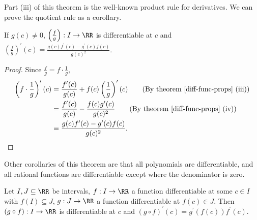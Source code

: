 \documentclass[../real_analysis.tex]{subfiles}
\begin{document}
        Part (iii) of this theorem is the well-known product rule for derivatives. We can prove the quotient rule as a corollary.
        \begin{corollary}
            If $g(c)\neq0$, $\left(\frac{f}{g}\right):I\to\RR$ is differentiable at $c$ and ${\left(\frac{f}{g}\right)^\prime(c)=\frac{g(c)f^\prime(c)-g^\prime(c) f(c)}{g(c)^2}}$.
        \end{corollary}
        \begin{proof}
            Since $\frac{f}{g}=f\cdot\frac{1}{g}$,
            \begin{align}
                \left(f\cdot\frac{1}{g}\right)^\prime(c)&=\frac{f^\prime(c)}{g(c)}+f(c)\left(\frac{1}{g}\right)^\prime(c)\tag{By theorem \ref{diff-func-props} (iii)}\\
                &=\frac{f^\prime(c)}{g(c)}-\frac{f(c)g^\prime(c)}{g(c)^2}\tag{By theorem \ref{diff-func-props} (iv)}\\
                &=\frac{g(c)f^\prime(c)-g^\prime(c)f(c)}{g(c)^2}.
            \end{align}
        \end{proof}
        Other corollaries of this theorem are that all polynomials are differentiable, and all rational functions are differentiable except where the denominator is zero.
        \begin{theorem}
            Let $I,J\subseteq\RR$ be intervals, $f:I\to\RR$ a function differentiable at some $c\in I$ with $f(I)\subseteq J$, $g:J\to\RR$ a function differentiable at $f(c)\in J$. Then $(g\circ f):I\to\RR$ is differentiable at $c$ and $(g\circ f)^\prime(c)=g^\prime(f(c))f^\prime(c)$.
        \end{theorem}
\end{document}

